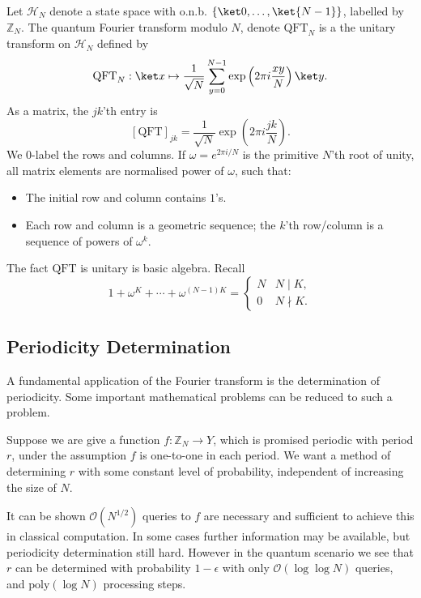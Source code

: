 \documentclass[12pt]{article}
\begin{document}
Let $\mathcal{H}_N$ denote a state space with o.n.b. $\{\ket 0, \ldots, \ket{N-1}\}$, labelled by $\mathbb{Z}_N$. The quantum Fourier transform modulo $N$, denote $\mathrm{QFT}_N$ is a the unitary transform on $\mathcal{H}_N$ defined by
\[
\mathrm{QFT}_N : \ket x \mapsto \frac{1}{\sqrt N} \sum_{y = 0}^{N - 1} \exp \left( 2 \pi i \frac{xy}{N} \right) \ket y.
\]
As a matrix, the $jk$'th entry is
\[
	[\mathrm{QFT}]_{jk} = \frac{1}{\sqrt N} \exp \left( 2 \pi i \frac{jk}{N} \right).
\]
We $0$-label the rows and columns. If $\omega = e^{2 \pi i/N}$ is the primitive $N$'th root of unity, all matrix elements are normalised power of $\omega$, such that:
\begin{itemize}
	\item The initial row and column contains $1$'s.
	\item Each row and column is a geometric sequence; the $k$'th row/column is a sequence of powers of $\omega^k$.
\end{itemize}
The fact $\mathrm{QFT}$ is unitary is basic algebra. Recall
\[
1 + \omega^K + \cdots + \omega^{(N-1)K} =
\begin{cases}
	N & N \mid K, \\
	0 & N \nmid K.
\end{cases}
\]

\subsection{Periodicity Determination}
\label{sub:pd}

A fundamental application of the Fourier transform is the determination of periodicity. Some important mathematical problems can be reduced to such a problem.

Suppose we are give a function $f : \mathbb{Z}_N \to Y$, which is promised periodic with period $r$, under the assumption $f$ is one-to-one in each period. We want a method of determining $r$ with some constant level of probability, independent of increasing the size of $N$.

It can be shown $\mathcal{O}(N^{1/2})$ queries to $f$ are necessary and sufficient to achieve this in classical computation. In some cases further information may be available, but periodicity determination still hard. However in the quantum scenario we see that $r$ can be determined with probability $1 - \epsilon$ with only $\mathcal{O}(\log \log N)$ queries, and $\mathrm{poly}(\log N)$ processing steps.
\end{document}
